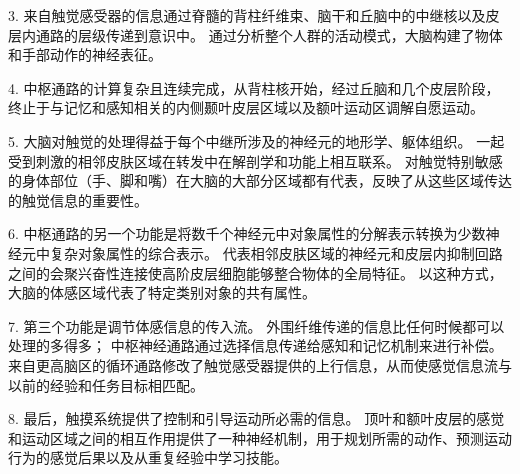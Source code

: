 3. 来自触觉感受器的信息通过脊髓的背柱纤维束、脑干和丘脑中的中继核以及皮层内通路的层级传递到意识中。 
通过分析整个人群的活动模式，大脑构建了物体和手部动作的神经表征。


4. 中枢通路的计算复杂且连续完成，从背柱核开始，经过丘脑和几个皮层阶段，终止于与记忆和感知相关的内侧颞叶皮层区域以及额叶运动区调解自愿运动。


5. 大脑对触觉的处理得益于每个中继所涉及的神经元的地形学、躯体组织。
一起受到刺激的相邻皮肤区域在转发中在解剖学和功能上相互联系。
对触觉特别敏感的身体部位（手、脚和嘴）在大脑的大部分区域都有代表，反映了从这些区域传达的触觉信息的重要性。 


6. 中枢通路的另一个功能是将数千个神经元中对象属性的分解表示转换为少数神经元中复杂对象属性的综合表示。
代表相邻皮肤区域的神经元和皮层内抑制回路之间的会聚兴奋性连接使高阶皮层细胞能够整合物体的全局特征。
以这种方式，大脑的体感区域代表了特定类别对象的共有属性。


7. 第三个功能是调节体感信息的传入流。
外围纤维传递的信息比任何时候都可以处理的多得多； 中枢神经通路通过选择信息传递给感知和记忆机制来进行补偿。
来自更高脑区的循环通路修改了触觉感受器提供的上行信息，从而使感觉信息流与以前的经验和任务目标相匹配。 


8. 最后，触摸系统提供了控制和引导运动所必需的信息。
顶叶和额叶皮层的感觉和运动区域之间的相互作用提供了一种神经机制，用于规划所需的动作、预测运动行为的感觉后果以及从重复经验中学习技能。



